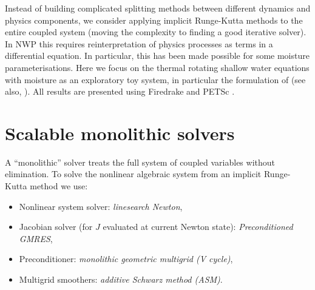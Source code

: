\documentclass[
]{ImperialPoster}
\begin{document}

\titlesection %

\begin{multicols}{3} %
	

   Instead of building complicated splitting methods between different
   dynamics and physics components, we consider applying implicit
   Runge-Kutta methods to the entire coupled system (moving the
   complexity to finding a good iterative solver). In NWP this
   requires reinterpretation of physics processes as terms in a
   differential equation. In particular, this has been made possible
   for some moisture parameterisations. Here we focus on the thermal
   rotating shallow water equations with moisture as an exploratory
   toy system, in particular the formulation of
   \cite{zerroukat2015moist} (see also, \cite{rostami2018improved}).
   All results are presented using Firedrake \cite{FiredrakeUserManual}
   and PETSc \cite{petsc-user-ref}.
     \vspace{-5mm}
  \section{Scalable monolithic solvers}
  \vspace{-5mm}
  A ``monolithic'' solver treats the full system of coupled variables
  without elimination. To solve the nonlinear algebraic system from an
  implicit Runge-Kutta method we use:
  \begin{itemize}[noitemsep, topsep=0pt]
  \item Nonlinear system solver: \emph{linesearch Newton},
  \item Jacobian solver (for $J$ evaluated at current Newton state):
    \emph{Preconditioned GMRES},
  \item Preconditioner: \emph{monolithic geometric multigrid (V cycle)},
  \item Multigrid smoothers: \emph{additive Schwarz method (ASM)}.
  \end{itemize}


\end{multicols}
\end{document}
